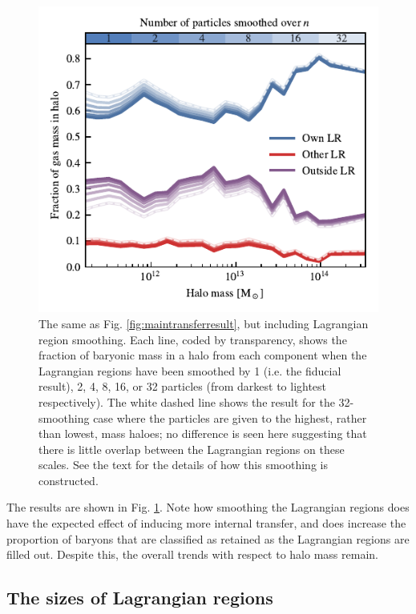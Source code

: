 \begin{figure}
	\centering
	\includegraphics{figures/convergence_smoothing.pdf}
	\vspace{-0.7cm}
 \caption{The same as Fig. \ref{fig:maintransferresult}, but including
 Lagrangian region smoothing. Each line, coded by transparency, shows the
 fraction of baryonic mass in a halo from each component when the Lagrangian
 regions have been smoothed by 1 (i.e. the fiducial result), 2, 4, 8, 16, or
 32 particles (from darkest to lightest respectively). The white dashed line
 shows the result for the 32-smoothing case where the particles are given to
 the highest, rather than lowest, mass haloes; no difference is seen here
 suggesting that there is little overlap between the Lagrangian regions on
 these scales. See the text for the details of how this smoothing is
 constructed.}
	\label{fig:smoothconv}
\end{figure}

The results are shown in Fig. \ref{fig:smoothconv}. Note how smoothing the
Lagrangian regions does have the expected effect of inducing more internal
transfer, and does increase the proportion of baryons that are classified as
retained as the Lagrangian regions are filled out. Despite this, the overall
trends with respect to halo mass remain.

\subsection{The sizes of Lagrangian regions}

